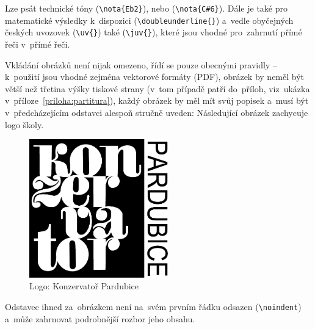 \nocite{*}

Lze psát technické tóny  (\texttt{{\textbackslash}nota\{Eb2\}}),
nebo  (\texttt{{\textbackslash}nota\{C\#6\}}). Dále je také
pro matematické výsledky k~dispozici 
(\texttt{{\textbackslash}doubleunderline\{\}}) a~vedle obyčejných českých
uvozovek (\texttt{{\textbackslash}uv\{\}}) také 
(\texttt{{\textbackslash}juv\{\}}), které jsou vhodné pro~zahrnutí přímé řeči
v~přímé řeči.

Vkládání obrázků není nijak omezeno, řídí se pouze obecnými pravidly --
k~použití jsou vhodné zejména vektorové formáty (PDF), obrázek by neměl být
větší než třetina výšky tiskové strany (v~tom případě patří do~příloh,
viz~ukázka v~příloze~\ref{priloha:partitura}), každý obrázek by měl mít svůj
popisek a~musí být v~předcházejícím odstavci alespoň stručně uveden: Následující
obrázek zachycuje logo školy.

\begin{figure}[!ht]
	\begin{center}
		\includegraphics[width=60mm]{./obrazky/kp-logo.pdf}
    \end{center}

	\caption{Logo: Konzervatoř Pardubice}
\end{figure}

\noindent
Odstavec ihned za~obrázkem není na~svém prvním řádku odsazen
(\texttt{{\textbackslash}noindent}) a~může zahrnovat podrobnější rozbor jeho
obsahu.
